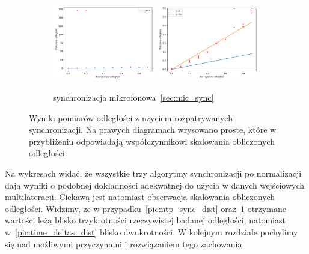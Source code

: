 \begin{figure}[H]
    \ContinuedFloat\centering
    \begin{subfigure}{\textwidth}
        \centering
        \includegraphics[width=0.49\textwidth]{pics/mic_sync_dist/dists.png}
        \includegraphics[width=0.49\textwidth]{pics/mic_sync_dist/dists_close.png}
        \caption{synchronizacja mikrofonowa~\ref{sec:mic_sync}}
        \label{pic:mic_sync_dist}
    \end{subfigure}
    \caption[Wyniki pomiarów odległości z użyciem rozpatrywanych synchronizacji]{Wyniki pomiarów odległości z użyciem rozpatrywanych synchronizacji. Na prawych diagramach wrysowano proste, które w przybliżeniu odpowiadają współczynnikowi skalowania obliczonych odległości.}
    \label{fig:sync_test}
\end{figure}

Na wykresach widać, że wszystkie trzy algorytmy synchronizacji po normalizacji dają wyniki o podobnej dokładności adekwatnej do użycia w danych wejściowych multilateracji. Ciekawą jest natomiast obserwacja skalowania obliczonych odległości. Widzimy, że w przypadku~\ref{pic:ntp_sync_dist} oraz~\ref{pic:mic_sync_dist} otrzymane wartości leżą blisko trzykrotności rzeczywistej badanej odległości, natomiast w~\ref{pic:time_deltas_dist} blisko dwukrotności. W kolejnym rozdziale pochylimy się nad możliwymi przyczynami i rozwiązaniem tego zachowania.